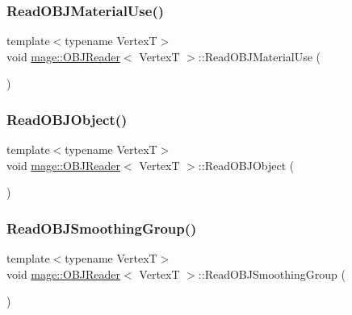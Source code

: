\hypertarget{classmage_1_1_o_b_j_reader_aa4c73ff0e5e3de40cacbebc189037802}{}\label{classmage_1_1_o_b_j_reader_aa4c73ff0e5e3de40cacbebc189037802} 
\subsubsection{\texorpdfstring{Read\+O\+B\+J\+Material\+Use()}{ReadOBJMaterialUse()}}
{\footnotesize\ttfamily template$<$typename VertexT$>$ \\
void \hyperlink{classmage_1_1_o_b_j_reader}{mage\+::\+O\+B\+J\+Reader}$<$ VertexT $>$\+::Read\+O\+B\+J\+Material\+Use (\begin{DoxyParamCaption}{ }\end{DoxyParamCaption})\hspace{0.3cm}{\ttfamily [private]}}

\hypertarget{classmage_1_1_o_b_j_reader_afc3f17024a006cce3b7869ca8c6a8f07}{}\label{classmage_1_1_o_b_j_reader_afc3f17024a006cce3b7869ca8c6a8f07} 
\subsubsection{\texorpdfstring{Read\+O\+B\+J\+Object()}{ReadOBJObject()}}
{\footnotesize\ttfamily template$<$typename VertexT$>$ \\
void \hyperlink{classmage_1_1_o_b_j_reader}{mage\+::\+O\+B\+J\+Reader}$<$ VertexT $>$\+::Read\+O\+B\+J\+Object (\begin{DoxyParamCaption}{ }\end{DoxyParamCaption})\hspace{0.3cm}{\ttfamily [private]}}

\hypertarget{classmage_1_1_o_b_j_reader_a2dd830c506ffbfbcd932b9bf75a35c56}{}\label{classmage_1_1_o_b_j_reader_a2dd830c506ffbfbcd932b9bf75a35c56} 
\subsubsection{\texorpdfstring{Read\+O\+B\+J\+Smoothing\+Group()}{ReadOBJSmoothingGroup()}}
{\footnotesize\ttfamily template$<$typename VertexT$>$ \\
void \hyperlink{classmage_1_1_o_b_j_reader}{mage\+::\+O\+B\+J\+Reader}$<$ VertexT $>$\+::Read\+O\+B\+J\+Smoothing\+Group (\begin{DoxyParamCaption}{ }\end{DoxyParamCaption})\hspace{0.3cm}{\ttfamily [private]}}

